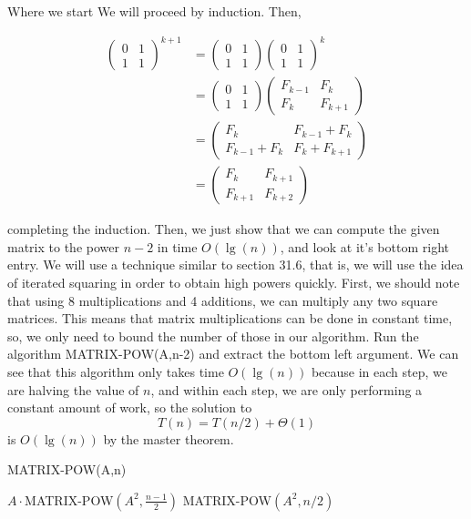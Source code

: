 \documentclass{article}
\begin{document}
\begin{enumerate}[a.]
Where we start We will proceed by induction. Then, 

\begin{align*}
\left( \begin{array}{cc}0&1\\1&1\end{array}\right)^{k+1} &= \left( \begin{array}{cc}0&1\\1&1\end{array}\right)\left( \begin{array}{cc}0&1\\1&1\end{array}\right)^{k}\\
&= \left( \begin{array}{cc}0&1\\1&1\end{array}\right)\left( \begin{array}{cc}F_{k-1}&F_{k}\\F_{k}&F_{k+1}\end{array}\right)\\
&=\left( \begin{array}{cc}F_k&F_{k-1} +F_k\\F_{k-1} + F_k&F_k + F_{k+1}\end{array}\right)\\
&=\left( \begin{array}{cc}F_k&F_{k+1}\\F_{k+1}&F_{k+2}\end{array}\right)
\end{align*}

completing the induction. Then, we just show that we can compute the given matrix to the power $n-2$ in time $O(\lg(n))$, and look at it's bottom right entry. We will use a technique similar to section 31.6, that is, we will use the idea of iterated squaring in order to obtain high powers quickly. First, we should note that using 8 multiplications and 4 additions, we can multiply any two square matrices. This means that matrix multiplications can be done in constant time, so, we only need to bound the number of those in our algorithm. Run the algorithm MATRIX-POW(A,n-2) and extract the bottom left argument. We can see that this algorithm only takes time $O(\lg(n))$ because in each step, we are halving the value of $n$, and within each step, we are only performing a constant amount of work, so the solution to 
\[
T(n) = T(n/2) + \Theta(1)
\]
is $O(\lg(n))$ by the master theorem.

\begin{algorithm}
\caption{MATRIX-POW(A,n)}
\begin{algorithmic}
\State \Return $A\cdot $MATRIX-POW$(A^2, \frac{n-1}{2})$
\Else
\State \Return MATRIX-POW$(A^2,n/2)$
\EndIf
\end{algorithmic}
\end{algorithm}


\end{enumerate}
\end{document}
